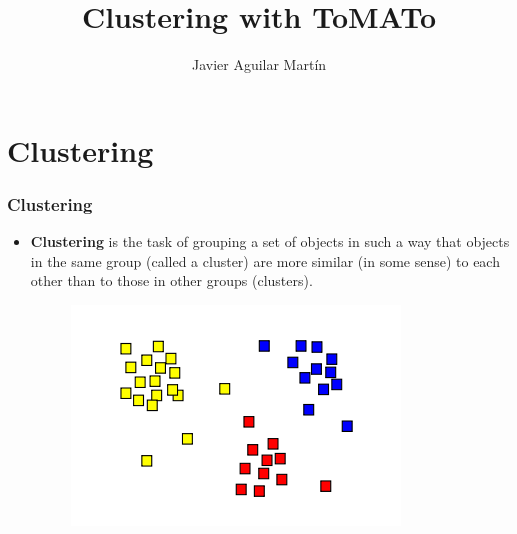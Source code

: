 \documentclass{beamer}
\title{Clustering with ToMATo}
\author{Javier Aguilar Mart\'in}
\institute{BIREP 2023}
\date{}
\theoremstyle{definition}
\begin{document}
\frame{\titlepage}





\newcommand{\seti}{\setcounter{saveenumi}{\value{enumi}}}
\newcommand{\conti}{\setcounter{enumi}{\value{saveenumi}}}

\makeatletter
\newcommand{\xRightarrow}[2][]{\ext@arrow 0359\Rightarrowfill@{#1}{#2}}
\makeatother




\section{Clustering}

\begin{frame}
\frametitle{Clustering}
\begin{itemize}
\item \textbf{Clustering} is the task of grouping a set of objects in such a way that objects in the same group (called a cluster) are more similar (in some sense) to each other than to those in other groups (clusters). %

\begin{figure}
\includegraphics[scale=0.5]{cluster}
\end{figure}
\end{itemize}
\end{frame}
\end{document}
